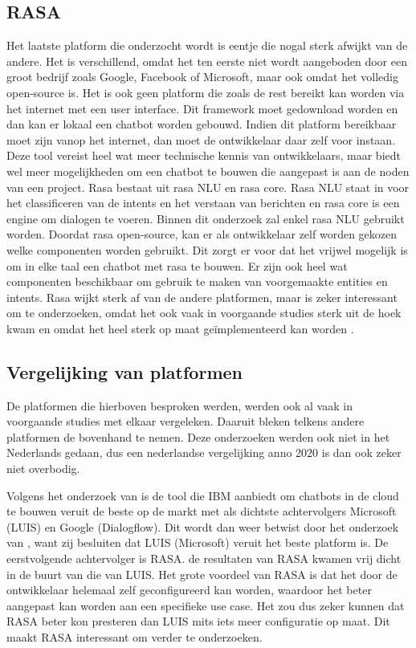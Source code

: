 \subsection{RASA}
\label{subsec:nlp-platformen-rasa}

Het laatste platform die onderzocht wordt is eentje die nogal sterk afwijkt van de andere. Het is verschillend, omdat het ten eerste niet wordt aangeboden door een groot bedrijf zoals Google, Facebook of Microsoft, maar ook omdat het volledig open-source is. Het is ook geen platform die zoals de rest bereikt kan worden via het internet met een user interface. Dit framework moet gedownload worden en dan kan er lokaal een chatbot worden gebouwd. Indien dit platform bereikbaar moet zijn vanop het internet, dan moet de ontwikkelaar daar zelf voor instaan. Deze tool vereist heel wat meer technische kennis van ontwikkelaars, maar biedt wel meer mogelijkheden om een chatbot te bouwen die aangepast is aan de noden van een project. Rasa bestaat uit rasa NLU en rasa core.  Rasa NLU staat in voor het classificeren van de intents en het verstaan van berichten en rasa core is een engine om dialogen te voeren. Binnen dit onderzoek zal enkel rasa NLU gebruikt worden. Doordat rasa open-source, kan er als ontwikkelaar zelf worden gekozen welke componenten worden gebruikt. Dit zorgt er voor dat het vrijwel mogelijk is om in elke taal een chatbot met rasa te bouwen. Er zijn ook heel wat componenten beschikbaar om gebruik te maken van voorgemaakte entities en intents. Rasa wijkt sterk af van de andere platformen, maar is zeker interessant om te onderzoeken, omdat het ook vaak in voorgaande studies sterk uit de hoek kwam en omdat het heel sterk op maat geïmplementeerd kan worden \autocite{RASA2020}.

\subsection{Vergelijking van platformen}
\label{subsec:nlp-platformen-vegelijking-platformen}


De platformen die hierboven besproken werden, werden ook al vaak in voorgaande studies met elkaar vergeleken. Daaruit bleken telkens andere platformen de bovenhand te nemen. Deze onderzoeken werden ook niet in het Nederlands gedaan, dus een nederlandse vergelijking anno 2020 is dan ook zeker niet overbodig.

Volgens het onderzoek van \textcite{Russis2018} is de tool die IBM aanbiedt om chatbots in de cloud te bouwen veruit de beste op de markt met als dichtste achtervolgers Microsoft (LUIS) en Google (Dialogflow). Dit wordt dan weer betwist door het onderzoek van \textcite{Langen2017}, want zij besluiten dat LUIS (Microsoft) veruit het beste platform is. De eerstvolgende achtervolger is RASA. de resultaten van RASA kwamen vrij dicht in de buurt van die van LUIS. Het grote voordeel van RASA is dat het door de ontwikkelaar helemaal zelf geconfigureerd kan worden, waardoor het beter aangepast kan worden aan een specifieke use case. Het zou dus zeker kunnen dat RASA beter kon presteren dan LUIS mits iets meer configuratie op maat. Dit maakt RASA interessant om verder te onderzoeken.

